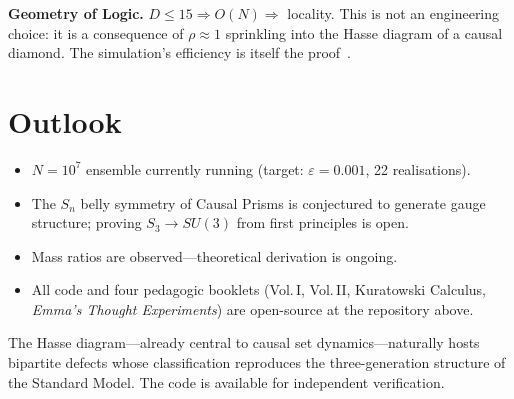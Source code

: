\documentclass[11pt,a4paper]{article}
\begin{document}
\textbf{Geometry of Logic.}
$D \leq 15 \Rightarrow O(N) \Rightarrow$ locality.
This is not an engineering choice: it is a consequence of $\rho \approx 1$
sprinkling into the Hasse diagram of a causal diamond.
The simulation's efficiency is itself the proof~\cite{stone1936,bombelli2009}.

\section{Outlook}

\begin{itemize}\setlength\itemsep{1pt}
  \item $N = 10^7$ ensemble currently running
    (target: $\varepsilon = 0.001$, 22 realisations).
  \item The $S_n$ belly symmetry of Causal Prisms is conjectured to
    generate gauge structure; proving $S_3 \to SU(3)$ from first
    principles is open.
  \item Mass ratios are observed---theoretical derivation is ongoing.
  \item All code and four pedagogic booklets (Vol.\,I, Vol.\,II,
    Kuratowski Calculus, \emph{Emma's Thought Experiments})
    are open-source at the repository above.
\end{itemize}

The Hasse diagram---already central to causal set dynamics---naturally
hosts bipartite defects whose classification reproduces the
three-generation structure of the Standard Model.
The code is available for independent verification.



\end{document}
